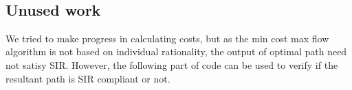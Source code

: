 \documentclass[11pt]{article}
\begin{document}
    \begin{center}
    \end{center}
    { \hspace*{\fill} \\}
    
    \subsection{Unused work}

We tried to make progress in calculating costs, but as the min cost max
flow algorithm is not based on individual rationality, the output of
optimal path need not satisy SIR. However, the following part of code
can be used to verify if the resultant path is SIR compliant or not.
\end{document}
